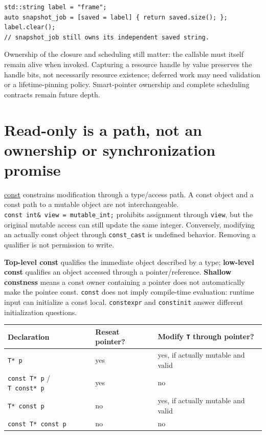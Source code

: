 \begin{verbatim}
std::string label = "frame";
auto snapshot_job = [saved = label] { return saved.size(); };
label.clear();
// snapshot_job still owns its independent saved string.
\end{verbatim}

Ownership of the closure and scheduling still matter: the callable must itself remain alive when invoked. Capturing a resource handle by value preserves the handle bits, not necessarily resource existence; deferred work may need validation or a lifetime-pinning policy. Smart-pointer ownership and complete scheduling contracts remain future depth.

\section{Read-only is a path, not an ownership or synchronization promise}\label{05-engine-i-ch003-read-only-is-a-path-not-an-ownership-or-synchronization-promise}

\hyperref[appendix-c25d60fed375]{const} constrains modification through a type/access path. A const object and a const path to a mutable object are not interchangeable. \texttt{const\ int\&\ view\ =\ mutable\_int;} prohibits assignment through \texttt{view}, but the original mutable access can still update the same integer. Conversely, modifying an actually const object through \texttt{const\_cast} is undefined behavior. Removing a qualifier is not permission to write.

\textbf{Top-level const} qualifies the immediate object described by a type; \textbf{low-level const} qualifies an object accessed through a pointer/reference. \textbf{Shallow constness} means a const owner containing a pointer does not automatically make the pointee const. \texttt{const} does not imply compile-time evaluation: runtime input can initialize a const local. \texttt{constexpr} and \texttt{constinit} answer different initialization questions.

{\def\LTcaptype{none} %
\begin{longtable}[]{@{}lll@{}}
\toprule\noalign{}
Declaration & Reseat pointer? & Modify \texttt{T} through pointer? \\
\midrule\noalign{}
\endhead
\bottomrule\noalign{}
\endlastfoot
\texttt{T*\ p} & yes & yes, if actually mutable and valid \\
\texttt{const\ T*\ p} / \texttt{T\ const*\ p} & yes & no \\
\texttt{T*\ const\ p} & no & yes, if actually mutable and valid \\
\texttt{const\ T*\ const\ p} & no & no \\
\end{longtable}
}

